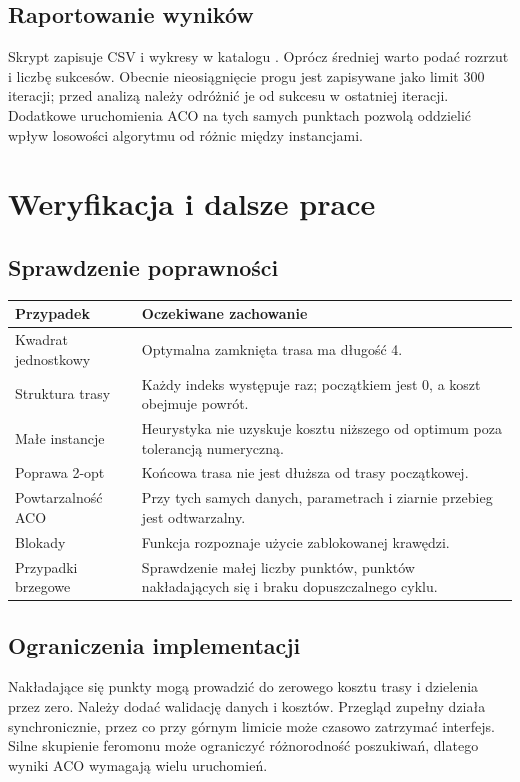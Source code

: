 \documentclass[11pt,a4paper]{article}
\newcommand{\plik}[1]{\texttt{\detokenize{#1}}}
\newcommand{\rozdzial}[1]{\clearpage\section{#1}}
\begin{document}
\subsection{Raportowanie wyników}
Skrypt zapisuje CSV i wykresy w katalogu \plik{wyniki/}. Oprócz średniej warto podać rozrzut i liczbę sukcesów. Obecnie nieosiągnięcie progu jest zapisywane jako limit 300 iteracji; przed analizą należy odróżnić je od sukcesu w ostatniej iteracji. Dodatkowe uruchomienia ACO na tych samych punktach pozwolą oddzielić wpływ losowości algorytmu od różnic między instancjami.

\rozdzial{Weryfikacja i dalsze prace}
\subsection{Sprawdzenie poprawności}
\begin{tabularx}{\textwidth}{@{}p{3.3cm}Y@{}}
\toprule
\textbf{Przypadek} & \textbf{Oczekiwane zachowanie} \\
\midrule
Kwadrat jednostkowy & Optymalna zamknięta trasa ma długość 4. \\
Struktura trasy & Każdy indeks występuje raz; początkiem jest 0, a koszt obejmuje powrót. \\
Małe instancje & Heurystyka nie uzyskuje kosztu niższego od optimum poza tolerancją numeryczną. \\
Poprawa 2-opt & Końcowa trasa nie jest dłuższa od trasy początkowej. \\
Powtarzalność ACO & Przy tych samych danych, parametrach i ziarnie przebieg jest odtwarzalny. \\
Blokady & Funkcja \plik{uses_blocked} rozpoznaje użycie zablokowanej krawędzi. \\
Przypadki brzegowe & Sprawdzenie małej liczby punktów, punktów nakładających się i braku dopuszczalnego cyklu. \\
\bottomrule
\end{tabularx}

\subsection{Ograniczenia implementacji}
Nakładające się punkty mogą prowadzić do zerowego kosztu trasy i dzielenia przez zero. Należy dodać walidację danych i kosztów. Przegląd zupełny działa synchronicznie, przez co przy górnym limicie może czasowo zatrzymać interfejs. Silne skupienie feromonu może ograniczyć różnorodność poszukiwań, dlatego wyniki ACO wymagają wielu uruchomień.
\end{document}

